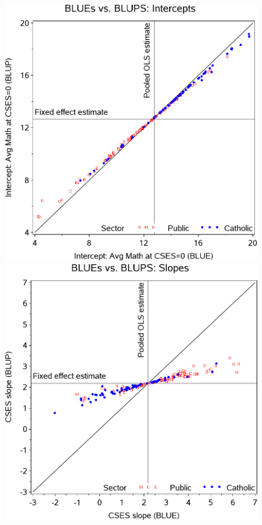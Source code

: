 \begin{figure}[htb]
 \begin{minipage}[b]{.49\linewidth}
  \centering
  \includegraphics[width=1\linewidth,clip]{fig/hsbmix41}
 \end{minipage}%
 \hfill
 \begin{minipage}[b]{.49\linewidth}
  \centering
  \includegraphics[width=1\linewidth,clip]{fig/hsbmix42}

\end{minipage}
\end{figure}
